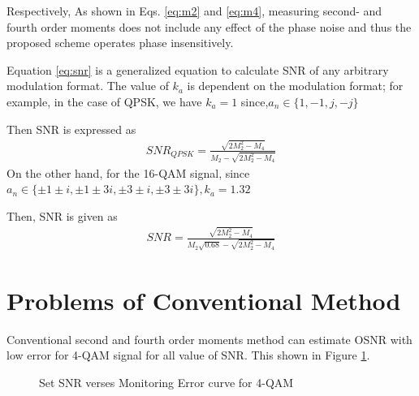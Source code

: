 \documentclass[12pt]{report}
\begin{document}
Respectively, As shown in Eqs. \ref{eq:m2} and \ref{eq:m4}, measuring second- and fourth order moments does not include any effect of the phase noise and thus the proposed scheme operates phase insensitively.

Equation \ref{eq:snr} is a generalized equation to calculate SNR of any arbitrary modulation format. The value of $k_a$ is dependent on the modulation format; for example, in the case of QPSK, we have $k_a=1$ since,$a_n\in\{1,-1,j,-j\}$

Then SNR is expressed as
\begin{align}
	SNR_{QPSK}=\frac{\sqrt{2M_2^2 -M_4}}{M_2-\sqrt{2M_2^2 -M_4}}
\end{align}
On the other hand, for the 16-QAM signal, since $a_n\in\{\pm 1 \pm i, \pm 1 \pm 3i, \pm 3 \pm i, \pm 3 \pm 3i\}, k_a=1.32$

Then, SNR is given as
\begin{align}\label{eq:snr16qam}
SNR=\frac{\sqrt{2M_2^2 -M_4}}{M_2\sqrt{0.68}-\sqrt{2M_2^2 -M_4}}
\end{align}

\section{Problems of Conventional Method}
Conventional second and fourth order moments method can estimate OSNR with low error for 4-QAM signal for all value of SNR. This shown in Figure \ref{fig:4-qam-error}.
\begin{figure}[htbp]
	\caption{Set SNR verses Monitoring Error curve for 4-QAM}
	\label{fig:4-qam-error}
\end{figure}
\end{document}
